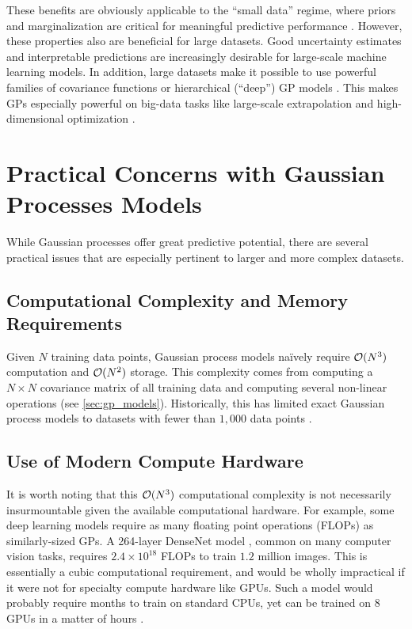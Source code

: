 \noindent
These benefits are obviously applicable to the ``small data'' regime, where priors and marginalization are critical for meaningful predictive performance \cite{rasmussen2001occam}.
However, these properties also are beneficial for large datasets.
Good uncertainty estimates and interpretable predictions are increasingly desirable for large-scale machine learning models.
In addition, large datasets make it possible to use powerful families of covariance functions \citep{wilson2013gaussian,wilson2016deep,benton2019function} or hierarchical (``deep'') GP models \cite{wilson2016deep,salimbeni2017doubly,jankowiak2020deep}.
This makes GPs especially powerful on big-data tasks like large-scale extrapolation \citep[e.g.][]{jankowiak2020parametric} and high-dimensional optimization \citep[e.g.][]{eriksson2019scalable}.


\section{Practical Concerns with Gaussian Processes Models}

While Gaussian processes offer great predictive potential, there are several practical issues that are especially pertinent to larger and more complex datasets.

\subsection{Computational Complexity and Memory Requirements}
Given $N$ training data points, Gaussian process models na\"{i}vely require $\bigo{N^3}$ computation and $\bigo{N^2}$ storage.
This complexity comes from computing a $N \times N$ covariance matrix of all training data and computing several non-linear operations (see \cref{sec:gp_models}).
Historically, this has limited exact Gaussian process models to datasets with fewer than $1,\!000$ data points \cite{hensman2013gaussian}.

\subsection{Use of Modern Compute Hardware}
It is worth noting that this $\bigo{N^3}$ computational complexity is not necessarily insurmountable given the available computational hardware.
For example, some deep learning models require as many floating point operations (FLOPs) as similarly-sized GPs.
A 264-layer DenseNet model \cite{huang2017densely}, common on many computer vision tasks, requires $2.4 \times 10^{18}$ FLOPs to train $1.2$ million images.
This is essentially a cubic computational requirement, and would be wholly impractical if it were not for specialty compute hardware like GPUs.
Such a model would probably require months to train on standard CPUs, yet can be trained on 8 GPUs in a matter of hours \cite{howard2018training}.


